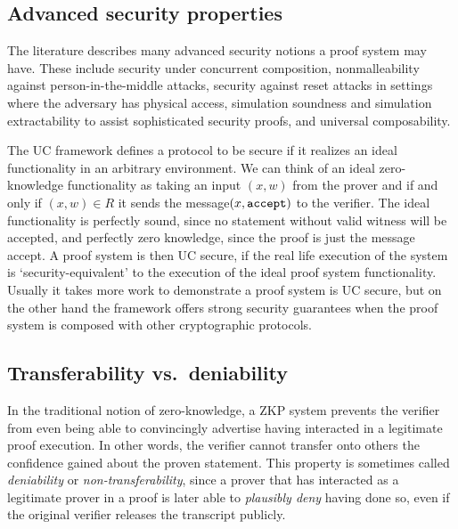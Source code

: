 \subsection{Advanced security properties}
\label{sec:security:defs-props:advanced-security-properties}

The literature describes many advanced security notions a proof system may have.
These include security under concurrent composition, nonmalleability against person-in-the-middle attacks, security against reset attacks in settings where the adversary has physical access, simulation soundness and simulation extractability to assist sophisticated security proofs, and universal composability.
 
The UC framework defines a protocol to be secure if it realizes an ideal functionality in an arbitrary environment. 
We can think of an ideal zero-knowledge functionality as taking an input $(x,w)$ from the prover and if and only if $(x,w) \in R$ it sends the message$ (x, \tt accept)$ to the verifier. 
The ideal functionality is perfectly sound, since no statement without valid witness will be accepted, and perfectly zero knowledge, since the proof is just the message accept. 
A proof system is then UC secure, if the real life execution of the system is `security-equivalent' to the execution of the ideal proof system functionality. 
Usually it takes more work to demonstrate a proof system is UC secure, but on the other hand the framework offers strong security guarantees when the proof system is composed with other cryptographic protocols.



\subsection{Transferability vs.\ deniability}
\label{sec:security:defs-props:transferability-deniability}

	
In the traditional notion of zero-knowledge, a ZKP system prevents the verifier from even being able to convincingly advertise having interacted in a legitimate proof execution.
In other words, the verifier cannot transfer onto others the confidence gained about the proven statement.
This property is sometimes called \emph{deniability} or \emph{non-transferability}, since a prover that has interacted as a legitimate prover in a proof is later able to \emph{plausibly deny} having done so, even if the original verifier releases the transcript publicly.

